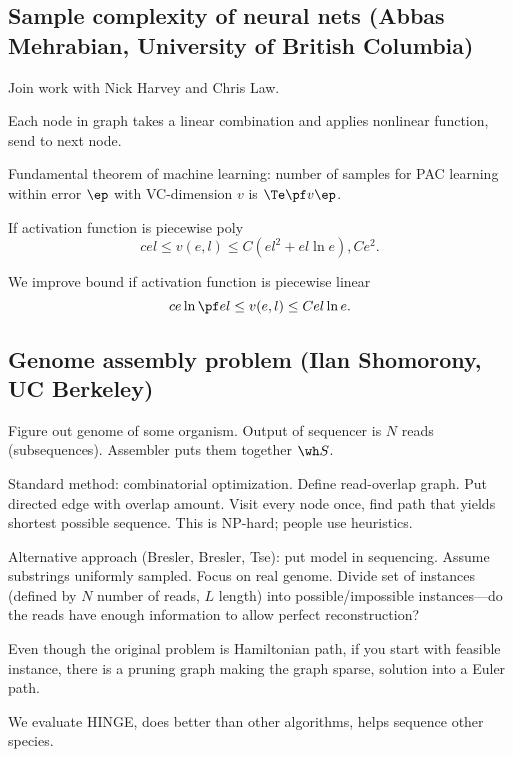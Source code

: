 \subsection{Sample complexity of neural nets (Abbas Mehrabian, University of British Columbia)}

Join work with Nick Harvey and Chris Law.

Each node in graph takes a linear combination and applies nonlinear function, send to next node.

Fundamental theorem of machine learning: number of samples for PAC learning within error $\ep$ with VC-dimension $v$ is $\Te\pf v\ep$.

If activation function is piecewise poly
$$cel \le v(e,l) \le C(el^2 + el\ln e), Ce^2.$$

We improve bound if activation function is piecewise linear
$$
ce\ln \pf el \le v(e,l) \le Cel \ln e.
$$
\subsection{Genome assembly problem (Ilan Shomorony, UC Berkeley)}

Figure out genome of some organism. Output of sequencer is $N$ reads (subsequences). Assembler puts them together $\wh S$. 

Standard method: combinatorial optimization. Define read-overlap graph. Put directed edge with overlap amount. Visit every node once, find path that yields shortest possible sequence. This is NP-hard; people use heuristics.

Alternative approach (Bresler, Bresler, Tse): put model in sequencing. Assume substrings uniformly sampled. Focus on real genome. Divide set of instances (defined by $N$ number of reads, $L$ length) into possible/impossible instances---do the reads have enough information to allow perfect reconstruction?

Even though the original problem is Hamiltonian path, if you start with feasible instance, there is a pruning graph making the graph sparse, solution into a Euler path.

We evaluate HINGE, does better than other algorithms, helps sequence other species.